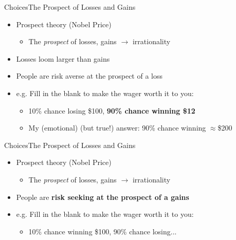 \documentclass{beamer}
\begin{document}
\begin{frame}{Choices}{The Prospect of Losses and Gains}
  \begin{itemize}
  \addtolength{\itemsep}{0.5\baselineskip}
  \item Prospect theory (Nobel Price) 
        \begin{itemize}
        \item The {\it prospect} of losses, gains $\rightarrow$ irrationality
        \end{itemize}
  \item Losses loom larger than gains
  \item People are risk averse at the prospect of a loss
  \item e.g. Fill in the blank to make the wager worth it to you:
        \begin{itemize}
        \addtolength{\itemsep}{0.5\baselineskip}
        \item 10\% chance losing \$100, {\bf 90\% chance winning \$12}
        \item My (emotional) (but true!) answer: 90\% chance winning $\approx$\$200
        \end{itemize}
  \end{itemize}

\end{frame}

\begin{frame}{Choices}{The Prospect of Losses and Gains}
  \begin{itemize}
  \addtolength{\itemsep}{0.5\baselineskip}
  \item Prospect theory (Nobel Price) 
        \begin{itemize}
        \item The {\it prospect} of losses, gains $\rightarrow$ irrationality
        \end{itemize}
  \item People are {\bf risk seeking at the prospect of a gains}
  \item e.g. Fill in the blank to make the wager worth it to you:
        \begin{itemize}
        \item 10\% chance winning \$100, 90\% chance losing...
        \end{itemize}
  \end{itemize}

\end{frame}
\end{document}
